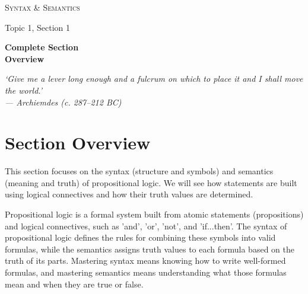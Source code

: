 \documentclass[a4paper, twoside]{article}
\newcommand{\standardpage}{
    \pagestyle{standard}
}
\begin{document}
\begin{titlepage}
\thispagestyle{copyright}
\centering

\vspace*{3cm}

{\Huge\scshape Syntax \& Semantics\par}
\vspace{0.3cm}

{\large Topic 1, Section 1\par}

\vspace{1.2cm}

{\LARGE\bfseries Complete Section \\[0.3em]
\large Overview\par}
\vfill

\begin{minipage}{0.7\textwidth}
\centering
\small\itshape
`Give me a lever long enough and a fulcrum on which to place it and I shall move the world.'\\[0.3cm]
— Archiemdes (c. 287--212 BC)
\end{minipage}

\vspace{1.5cm}

\end{titlepage}

\newpage

\tableofcontents

\newpage

\newpage
\standardpage

\restoregeometry 
{}
\setcounter{page}{1}

\section{Section Overview}
This section focuses on the syntax (structure and symbols) and semantics (meaning and truth) of propositional logic. We will see how statements are built using logical connectives and how their truth values are determined.

Propositional logic is a formal system built from atomic statements (propositions) and logical connectives, such as 'and', 'or', 'not', and 'if...then'. The syntax of propositional logic defines the rules for combining these symbols into valid formulas, while the semantics assigns truth values to each formula based on the truth of its parts. Mastering syntax means knowing how to write well-formed formulas, and mastering semantics means understanding what those formulas mean and when they are true or false.
\end{document}
